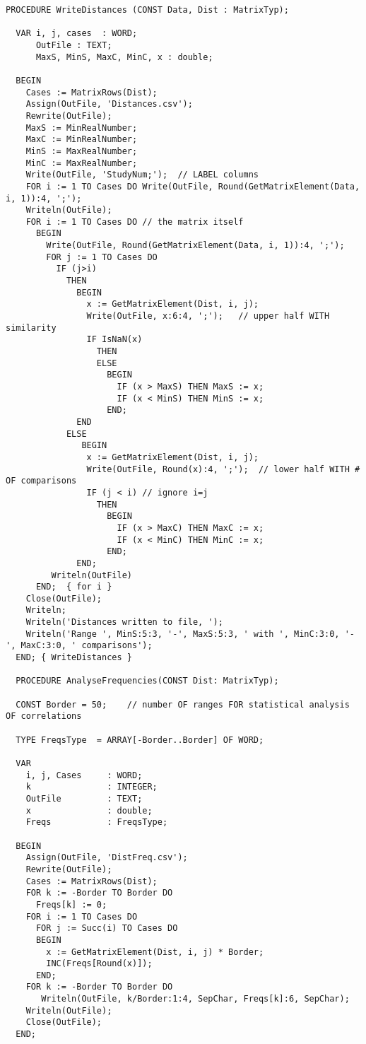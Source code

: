 \begin{refsection}
\begin{lstlisting}[caption=Distance matrix]
  PROCEDURE WriteDistances (CONST Data, Dist : MatrixTyp);

  VAR i, j, cases  : WORD;
      OutFile : TEXT;
      MaxS, MinS, MaxC, MinC, x : double;

  BEGIN
    Cases := MatrixRows(Dist);
    Assign(OutFile, 'Distances.csv');
    Rewrite(OutFile);
    MaxS := MinRealNumber;
    MaxC := MinRealNumber;
    MinS := MaxRealNumber;
    MinC := MaxRealNumber;
    Write(OutFile, 'StudyNum;');  // LABEL columns
    FOR i := 1 TO Cases DO Write(OutFile, Round(GetMatrixElement(Data, i, 1)):4, ';');
    Writeln(OutFile);
    FOR i := 1 TO Cases DO // the matrix itself
      BEGIN
        Write(OutFile, Round(GetMatrixElement(Data, i, 1)):4, ';');
        FOR j := 1 TO Cases DO
          IF (j>i)
            THEN
              BEGIN
                x := GetMatrixElement(Dist, i, j);
                Write(OutFile, x:6:4, ';');   // upper half WITH similarity
                IF IsNaN(x)
                  THEN
                  ELSE
                    BEGIN
                      IF (x > MaxS) THEN MaxS := x;
                      IF (x < MinS) THEN MinS := x;
                    END;
              END
            ELSE
               BEGIN
                x := GetMatrixElement(Dist, i, j);
                Write(OutFile, Round(x):4, ';');  // lower half WITH # OF comparisons
                IF (j < i) // ignore i=j
                  THEN
                    BEGIN
                      IF (x > MaxC) THEN MaxC := x;
                      IF (x < MinC) THEN MinC := x;
                    END;
              END;
         Writeln(OutFile)
      END;  { for i }
    Close(OutFile);
    Writeln;
    Writeln('Distances written to file, ');
    Writeln('Range ', MinS:5:3, '-', MaxS:5:3, ' with ', MinC:3:0, '-', MaxC:3:0, ' comparisons');
  END; { WriteDistances }

  PROCEDURE AnalyseFrequencies(CONST Dist: MatrixTyp);

  CONST Border = 50;    // number OF ranges FOR statistical analysis OF correlations

  TYPE FreqsType  = ARRAY[-Border..Border] OF WORD;

  VAR
    i, j, Cases     : WORD;
    k               : INTEGER;
    OutFile         : TEXT;
    x               : double;
    Freqs           : FreqsType;

  BEGIN
    Assign(OutFile, 'DistFreq.csv');
    Rewrite(OutFile);
    Cases := MatrixRows(Dist);
    FOR k := -Border TO Border DO
      Freqs[k] := 0;
    FOR i := 1 TO Cases DO
      FOR j := Succ(i) TO Cases DO
      BEGIN
        x := GetMatrixElement(Dist, i, j) * Border;
        INC(Freqs[Round(x)]);
      END;
    FOR k := -Border TO Border DO
       Writeln(OutFile, k/Border:1:4, SepChar, Freqs[k]:6, SepChar);
    Writeln(OutFile);
    Close(OutFile);
  END;
\end{lstlisting}


\end{refsection}
